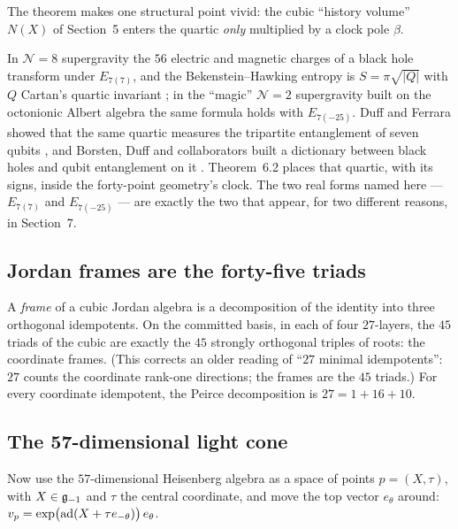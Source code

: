 The theorem makes one structural point vivid: the cubic ``history volume'' $N(X)$ of
Section~5 enters the quartic \emph{only} multiplied by a clock pole $\beta$.

\begin{physical}
In $\mathcal N=8$ supergravity the $56$ electric and magnetic charges of a black hole
transform under $E_{7(7)}$, and the Bekenstein--Hawking entropy is
$S=\pi\sqrt{|Q|}$ with $Q$ Cartan's quartic invariant \cite{KalloshKol}; in the
``magic'' $\mathcal N=2$ supergravity built on the octonionic Albert algebra the same
formula holds with $E_{7(-25)}$. Duff and Ferrara showed that the same quartic measures
the tripartite entanglement of seven qubits \cite{DuffFerrara}, and Borsten, Duff and
collaborators built a dictionary between black holes and qubit entanglement on it
\cite{BDDER}. Theorem~6.2 places that quartic, with its signs, inside the forty-point
geometry's clock. The two real forms named here --- $E_{7(7)}$ and $E_{7(-25)}$ --- are
exactly the two that appear, for two different reasons, in Section~7. \tierB
\end{physical}

\subsection{Jordan frames are the forty-five triads}

A \emph{frame} of a cubic Jordan algebra is a decomposition of the identity into three
orthogonal idempotents. On the committed basis, in each of four $27$-layers, the $45$ triads
of the cubic are exactly the $45$ strongly orthogonal triples of roots: the coordinate
frames. (This corrects an older reading of ``$27$ minimal idempotents'': $27$ counts the
coordinate rank-one directions; the frames are the $45$ triads.) For every coordinate
idempotent, the Peirce decomposition is $27=1+16+10$. \tierC

\subsection{The 57-dimensional light cone}

Now use the $57$-dimensional Heisenberg algebra as a space of points $p=(X,\tau)$, with
$X\in\mathfrak{g}_{-1}$ and $\tau$ the central coordinate, and move the top vector $e_\theta$ around:
$v_p=\exp\bigl(\mathrm{ad}(X+\tau e_{-\theta})\bigr)\,e_\theta$.

